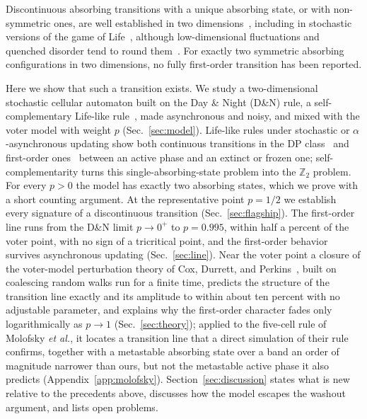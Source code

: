 \documentclass[pre,twocolumn,superscriptaddress,showpacs,floatfix]{revtex4-2}
\begin{document}
Discontinuous absorbing transitions with a unique absorbing state, or with non-symmetric ones,
are well established in two dimensions~\cite{ziff1986,bidaux1989,odor1996,lubeck2006,grassberger2006},
including in stochastic versions of the game of Life~\cite{schulman1978,monetti1995,monetti2001},
although low-dimensional fluctuations and quenched disorder tend to round
them~\cite{hinrichsen2000fo,villamartin2014}. For exactly two symmetric absorbing configurations
in two dimensions, no fully first-order transition has been reported.

Here we show that such a transition exists. We study a two-dimensional stochastic cellular
automaton built on the Day \& Night (D\&N) rule, a self-complementary Life-like
rule~\cite{eppstein2010}, made asynchronous and noisy, and mixed with the voter model with weight
$p$ (Sec.~\ref{sec:model}). Life-like rules under stochastic or $\alpha$-asynchronous updating
show both continuous transitions in the DP class~\cite{blok1999,fates2010} and first-order
ones~\cite{monetti1995,monetti2001,roy2024} between an active phase and an extinct or frozen one;
self-complementarity turns this single-absorbing-state problem into the $\mathbb{Z}_2$ problem.
For every $p>0$ the model has exactly two absorbing states, which we prove with a short counting
argument. At the representative point $p = 1/2$ we establish every signature of a discontinuous
transition (Sec.~\ref{sec:flagship}). The first-order line runs from the D\&N limit $p\to 0^+$ to
$p = 0.995$, within half a percent of the voter point, with no sign of a tricritical point, and
the first-order behavior survives asynchronous updating (Sec.~\ref{sec:line}). Near the voter
point a closure of the voter-model perturbation theory of Cox, Durrett, and
Perkins~\cite{cox2013}, built on coalescing random walks run for a finite time, predicts the
structure of the transition line exactly and its amplitude to within about ten percent with no
adjustable parameter, and explains why the first-order character fades only logarithmically as
$p\to 1$ (Sec.~\ref{sec:theory}); applied to the five-cell rule of Molofsky \emph{et al.}, it
locates a transition line that a direct simulation of their rule confirms, together with a
metastable absorbing state over a band an order of magnitude narrower than ours, but not the
metastable active phase it also predicts (Appendix~\ref{app:molofsky}). Section~\ref{sec:discussion} states what is new relative to
the precedents above, discusses how the model escapes the washout argument, and lists open
problems.
\end{document}
